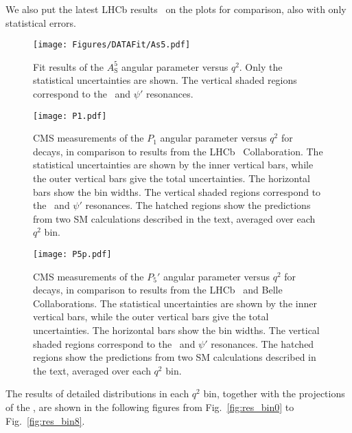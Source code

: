 We also put the latest LHCb results~\cite{LHCbP5p} on the plots for comparison, also with only statistical errors.


\begin{figure}[!hbtp]
  \centering
  \texttt{[image: Figures/DATAFit/As5.pdf]}
  \caption{Fit results of the $A^5_\mathrm{S}$ angular parameter versus $q^2$.
    Only the statistical uncertainties are shown.
    The vertical shaded regions correspond to the \cPJgy\ and $\psi'$ resonances.}
  \label{fig:fitresultAs5}
\end{figure}


\begin{figure}[htbp!]
  \begin{center}
    \texttt{[image: P1.pdf]}
    \caption{CMS measurements of the $P_1$ angular parameter versus $q^2$ for \BtoKstmumu decays, in comparison to results from the LHCb~\cite{LHCbP5p2} Collaboration.
      The statistical uncertainties are shown by the inner vertical bars, while the outer vertical bars give the total uncertainties.
      The horizontal bars show the bin widths. The vertical shaded regions correspond to the \cPJgy\ and $\psi'$ resonances.
      The hatched regions show the predictions from two SM calculations described in the text, averaged over each $q^2$ bin.}
    \label{fig:fitresultP1}
  \end{center}
\end{figure}

\begin{figure}[htbp!]
  \begin{center}
    \texttt{[image: P5p.pdf]}
    \caption{CMS measurements of the $P_5'$ angular parameter versus $q^2$ for \BtoKstmumu decays, in comparison to results from the LHCb~\cite{LHCbP5p2} and Belle~\cite{BelleP5p} Collaborations.
      The statistical uncertainties are shown by the inner vertical bars, while the outer vertical bars give the total uncertainties.
      The horizontal bars show the bin widths. The vertical shaded regions correspond to the \cPJgy\ and $\psi'$ resonances.
      The hatched regions show the predictions from two SM calculations described in the text, averaged over each $q^2$ bin.}
    \label{fig:fitresultp5}
  \end{center}
\end{figure}

The results of detailed distributions in each $q^2$ bin, together with the projections of the \pdf, are shown in the following figures from Fig.~\ref{fig:res_bin0} to Fig.~\ref{fig:res_bin8}.

